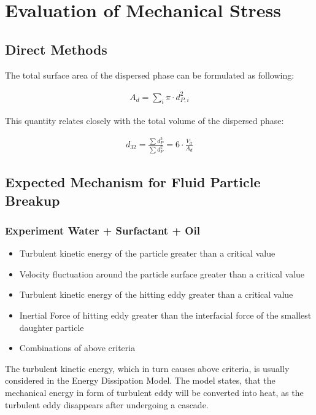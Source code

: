 \section{Evaluation of Mechanical Stress}

\subsection{Direct Methods}

The total surface area of the dispersed phase can be formulated as following:

\begin{align}
    \displaystyle	A_d = \sum_i \pi \cdot d_{P,i}^2
\end{align}

This quantity relates closely with the total volume of the dispersed phase:

\begin{align}
	d_{32} = \frac{\sum d_P^3}{\sum d_P^2} = 6 \cdot \frac{V_d}{A_d}
\end{align}




\subsection{Expected Mechanism for Fluid Particle Breakup}

\subsubsection{Experiment Water + Surfactant + Oil} \label{sec:expWaterSurfOil}
\begin{itemize}
	\item Turbulent kinetic energy of the particle greater than a critical value
	\item Velocity fluctuation around the particle surface greater than a critical value
	\item Turbulent kinetic energy of the hitting eddy greater than a critical value
	\item Inertial Force of hitting eddy greater than the interfacial force of the smallest daughter particle
	\item Combinations of above criteria
\end{itemize}
The turbulent kinetic energy, which in turn causes above criteria, is usually considered in the Energy Dissipation Model. The model states, that the mechanical energy in form of turbulent eddy will be converted into heat, as the turbulent eddy disappears after undergoing a cascade.

